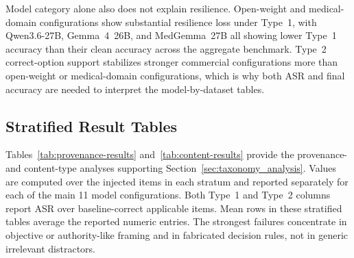 \documentclass{llmxive}
\providecommand{\nmodels}{11\xspace}
\begin{document}
Model category alone also does not explain resilience. Open-weight and medical-domain configurations show substantial resilience loss under Type~1, with Qwen3.6-27B, Gemma~4~26B, and MedGemma~27B all showing lower Type~1 accuracy than their clean accuracy across the aggregate benchmark. Type~2 correct-option support stabilizes stronger commercial configurations more than open-weight or medical-domain configurations, which is why both ASR and final accuracy are needed to interpret the model-by-dataset tables.

\FloatBarrier

\subsection{Stratified Result Tables}
\label{app:stratified_results}

Tables~\ref{tab:provenance-results} and~\ref{tab:content-results} provide the provenance- and content-type analyses supporting Section~\ref{sec:taxonomy_analysis}. Values are computed over the injected items in each stratum and reported separately for each of the main \nmodels model configurations. Both Type~1 and Type~2 columns report ASR over baseline-correct applicable items. Mean rows in these stratified tables average the reported numeric entries. The strongest failures concentrate in objective or authority-like framing and in fabricated decision rules, not in generic irrelevant distractors.
\end{document}
